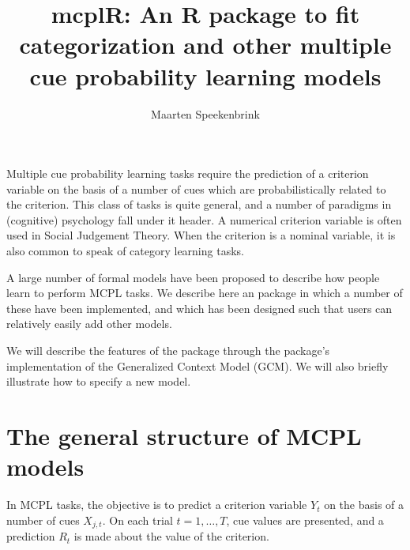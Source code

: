 \documentclass[doc]{apa}
\title{mcplR: An R package to fit categorization and other multiple cue probability learning models}
\author{Maarten Speekenbrink}
\affiliation{Department of Psychology \\ University College London}
\newcommand{\code}[1]{{\ttfamily{#1}}}
\begin{document}
\maketitle

Multiple cue probability learning tasks require the prediction of a criterion variable on the basis of a number of cues which are probabilistically related to the criterion. This class of tasks is quite general, and a number of paradigms in (cognitive) psychology fall under it header. A numerical criterion variable is often used in Social Judgement Theory. When the criterion is a nominal variable, it is also common to speak of category learning tasks. 

A large number of formal models have been proposed to describe how people learn to perform MCPL tasks. We describe here an \code{R} package in which a number of these have been implemented, and which has been designed such that users can relatively easily add other models. 

We will describe the features of the package through the package's implementation of the Generalized Context Model (GCM). We will also briefly illustrate how to specify a new model. 

\section{The general structure of MCPL models}

In MCPL tasks, the objective is to predict a criterion variable $Y_t$ on the basis of a number of cues $X_{j,t}$. On each trial $t = 1,\ldots,T$, cue values are presented, and a prediction $R_t$ is made about the value of the criterion.
\end{document}
